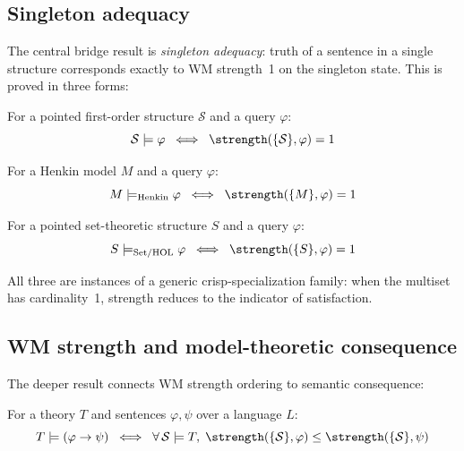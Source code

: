 \documentclass[11pt,openany]{report}
\begin{document}
\subsection{Singleton adequacy}

The central bridge result is \emph{singleton adequacy}: truth of a
sentence in a single structure corresponds exactly to WM strength~1
on the singleton state.  This is proved in three forms:

\begin{theorem}
For a pointed first-order structure $\mathcal{S}$ and a query
$\varphi$:
\[
  \mathcal{S} \models \varphi
  \;\;\Longleftrightarrow\;\;
  \strength(\{\mathcal{S}\}, \varphi) = 1
\]
\end{theorem}

\begin{theorem}
For a Henkin model $M$ and a query $\varphi$:
\[
  M \models_{\mathrm{Henkin}} \varphi
  \;\;\Longleftrightarrow\;\;
  \strength(\{M\}, \varphi) = 1
\]
\end{theorem}

\begin{theorem}
For a pointed set-theoretic structure $S$ and a query $\varphi$:
\[
  S \models_{\mathrm{Set/HOL}} \varphi
  \;\;\Longleftrightarrow\;\;
  \strength(\{S\}, \varphi) = 1
\]
\end{theorem}

\noindent
All three are instances of a generic crisp-specialization family: when
the multiset has cardinality~1, strength reduces to the indicator of
satisfaction.

\subsection{WM strength and model-theoretic consequence}

The deeper result connects WM strength ordering to semantic
consequence:

\begin{theorem}
\label{thm:consequence-strength}
For a theory $T$ and sentences $\varphi, \psi$ over a language $L$:
\[
  T \models (\varphi \to \psi)
  \;\;\Longleftrightarrow\;\;
  \forall\, \mathcal{S} \models T,\;
  \strength(\{\mathcal{S}\}, \varphi)
  \le \strength(\{\mathcal{S}\}, \psi)
\]
\end{theorem}
\end{document}
